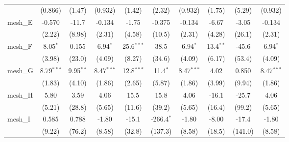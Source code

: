 \begin{tabular}{lccccccccc}
                                                               & (0.866)       & (1.47)         & (0.932)       & (1.42)         & (2.32)         & (0.932)       & (1.75)         & (5.29)         & (0.932)\\   
   mesh\_E                                                     & -0.570        & -11.7          & -0.134        & -1.75          & -0.375         & -0.134        & -6.67          & -3.05          & -0.134\\   
                                                               & (2.22)        & (8.98)         & (2.31)        & (4.58)         & (10.5)         & (2.31)        & (4.28)         & (26.1)         & (2.31)\\   
   mesh\_F                                                     & 8.05$^{*}$    & 0.155          & 6.94$^{*}$    & 25.6$^{***}$   & 38.5           & 6.94$^{*}$    & 13.4$^{**}$    & -45.6          & 6.94$^{*}$\\   
                                                               & (3.98)        & (23.0)         & (4.09)        & (8.27)         & (34.6)         & (4.09)        & (6.17)         & (53.4)         & (4.09)\\   
   mesh\_G                                                     & 8.79$^{***}$  & 9.95$^{**}$    & 8.47$^{***}$  & 12.8$^{***}$   & 11.4$^{*}$     & 8.47$^{***}$  & 4.02           & 0.850          & 8.47$^{***}$\\   
                                                               & (1.83)        & (4.10)         & (1.86)        & (2.65)         & (5.87)         & (1.86)        & (3.99)         & (9.94)         & (1.86)\\   
   mesh\_H                                                     & 5.80          & 3.59           & 4.06          & 15.5           & 15.8           & 4.06          & -16.1          & -25.7          & 4.06\\   
                                                               & (5.21)        & (28.8)         & (5.65)        & (11.6)         & (39.2)         & (5.65)        & (16.4)         & (99.2)         & (5.65)\\   
   mesh\_I                                                     & 0.585         & 0.788          & -1.80         & -15.1          & -266.4$^{*}$   & -1.80         & -8.00          & -17.4          & -1.80\\   
                                                               & (9.22)        & (76.2)         & (8.58)        & (32.8)         & (137.3)        & (8.58)        & (18.5)         & (141.0)        & (8.58)\\   

\end{tabular}
